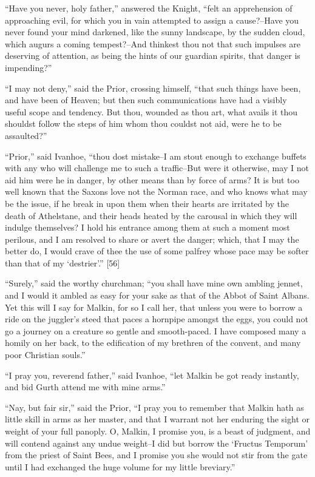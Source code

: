 ``Have you never, holy father,'' answered the Knight, ``felt an
apprehension of approaching evil, for which you in vain attempted to
assign a cause?--Have you never found your mind darkened, like the sunny
landscape, by the sudden cloud, which augurs a coming tempest?--And
thinkest thou not that such impulses are deserving of attention, as
being the hints of our guardian spirits, that danger is impending?''

``I may not deny,'' said the Prior, crossing himself, ``that such things
have been, and have been of Heaven; but then such communications have
had a visibly useful scope and tendency. But thou, wounded as thou art,
what avails it thou shouldst follow the steps of him whom thou couldst
not aid, were he to be assaulted?''

``Prior,'' said Ivanhoe, ``thou dost mistake--I am stout enough to
exchange buffets with any who will challenge me to such a traffic--But
were it otherwise, may I not aid him were he in danger, by other means
than by force of arms? It is but too well known that the Saxons love not
the Norman race, and who knows what may be the issue, if he break in
upon them when their hearts are irritated by the death of Athelstane,
and their heads heated by the carousal in which they will indulge
themselves? I hold his entrance among them at such a moment most
perilous, and I am resolved to share or avert the danger; which, that I
may the better do, I would crave of thee the use of some palfrey whose
pace may be softer than that of my `destrier'.'' {[}56{]}

``Surely,'' said the worthy churchman; ``you shall have mine own ambling
jennet, and I would it ambled as easy for your sake as that of the Abbot
of Saint Albans. Yet this will I say for Malkin, for so I call her, that
unless you were to borrow a ride on the juggler's steed that paces a
hornpipe amongst the eggs, you could not go a journey on a creature so
gentle and smooth-paced. I have composed many a homily on her back, to
the edification of my brethren of the convent, and many poor Christian
souls.''

``I pray you, reverend father,'' said Ivanhoe, ``let Malkin be got ready
instantly, and bid Gurth attend me with mine arms.''

``Nay, but fair sir,'' said the Prior, ``I pray you to remember that
Malkin hath as little skill in arms as her master, and that I warrant
not her enduring the sight or weight of your full panoply. O, Malkin, I
promise you, is a beast of judgment, and will contend against any undue
weight--I did but borrow the `Fructus Temporum' from the priest of Saint
Bees, and I promise you she would not stir from the gate until I had
exchanged the huge volume for my little breviary.''


